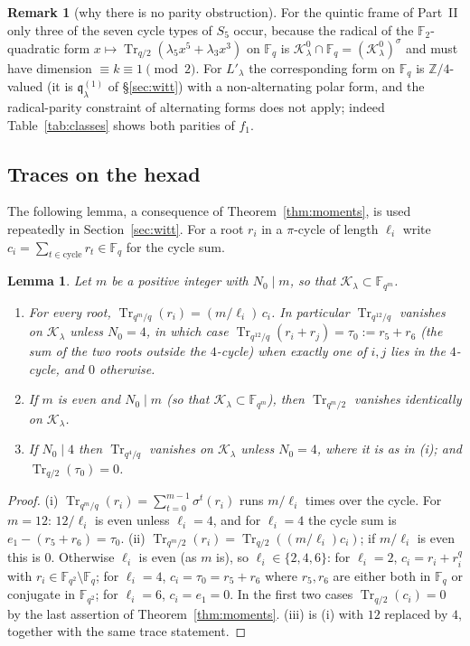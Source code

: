 ﻿\documentclass[12pt,a4paper]{amsart}
\newtheorem{lemma}[theorem]{Lemma}
\theoremstyle{definition}
\newtheorem{remark}[theorem]{Remark}
\newcommand{\F}{\mathbb{F}}
\newcommand{\Z}{\mathbb{Z}}
\newcommand{\Tr}{\operatorname{Tr}}
\newcommand{\Kk}{\mathcal{K}}
\newcommand{\qq}{\mathfrak{q}}
\begin{document}
\begin{remark}[why there is no parity obstruction]
For the quintic frame of Part~II only three of the seven cycle types of $S_5$ occur, because the radical of the $\F_2$-quadratic form $x\mapsto\Tr_{q/2}(\lambda_5x^5+\lambda_3x^3)$ on $\F_q$ is $\Kk^0_\lambda\cap\F_q=(\Kk^0_\lambda)^\sigma$ and must have dimension $\equiv k\equiv1\pmod 2$. For $L'_\lambda$ the corresponding form on $\F_q$ is $\Z/4$-valued (it is $\qq^{(1)}_\lambda$ of \S\ref{sec:witt}) with a non-alternating polar form, and the radical-parity constraint of alternating forms does not apply; indeed Table~\ref{tab:classes} shows both parities of $f_1$.
\end{remark}

\subsection{Traces on the hexad}
The following lemma, a consequence of Theorem~\ref{thm:moments}, is used repeatedly in Section~\ref{sec:witt}. For a root $r_i$ in a $\pi$-cycle of length $\ell_i$ write $c_i=\sum_{t\in\text{cycle}}r_t\in\F_q$ for the cycle sum.

\begin{lemma}\label{lem:traces}
Let $m$ be a positive integer with $N_0\mid m$, so that $\Kk_\lambda\subset\F_{q^m}$.
\begin{enumerate}[label=\textup{(\roman*)},leftmargin=2em]
\item For every root, $\Tr_{q^m/q}(r_i)=(m/\ell_i)\,c_i$. In particular $\Tr_{q^{12}/q}$ vanishes on $\Kk_\lambda$ unless $N_0=4$, in which case $\Tr_{q^{12}/q}(r_i+r_j)=\tau_0:=r_5+r_6$ (the sum of the two roots outside the $4$-cycle) when exactly one of $i,j$ lies in the $4$-cycle, and $0$ otherwise.
\item If $m$ is even and $N_0\mid m$ (so that $\Kk_\lambda\subset\F_{q^m}$), then $\Tr_{q^m/2}$ vanishes identically on $\Kk_\lambda$.
\item If $N_0\mid4$ then $\Tr_{q^4/q}$ vanishes on $\Kk_\lambda$ unless $N_0=4$, where it is as in \textup{(i)}; and $\Tr_{q/2}(\tau_0)=0$.
\end{enumerate}
\end{lemma}
\begin{proof}
(i) $\Tr_{q^m/q}(r_i)=\sum_{t=0}^{m-1}\sigma^t(r_i)$ runs $m/\ell_i$ times over the cycle. For $m=12$: $12/\ell_i$ is even unless $\ell_i=4$, and for $\ell_i=4$ the cycle sum is $e_1-(r_5+r_6)=\tau_0$. (ii) $\Tr_{q^m/2}(r_i)=\Tr_{q/2}((m/\ell_i)c_i)$; if $m/\ell_i$ is even this is $0$. Otherwise $\ell_i$ is even (as $m$ is), so $\ell_i\in\{2,4,6\}$: for $\ell_i=2$, $c_i=r_i+r_i^q$ with $r_i\in\F_{q^2}\setminus\F_q$; for $\ell_i=4$, $c_i=\tau_0=r_5+r_6$ where $r_5,r_6$ are either both in $\F_q$ or conjugate in $\F_{q^2}$; for $\ell_i=6$, $c_i=e_1=0$. In the first two cases $\Tr_{q/2}(c_i)=0$ by the last assertion of Theorem~\ref{thm:moments}. (iii) is (i) with $12$ replaced by $4$, together with the same trace statement.
\end{proof}
\end{document}
